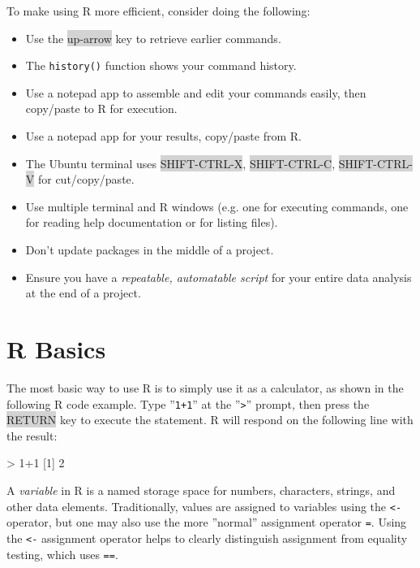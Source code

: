 \begin{infobox}
To make using R more efficient, consider doing the following:

\begin{itemize}
    \item Use the {\footnotesize\colorbox{lightgray}{up-arrow}} key to retrieve earlier commands.
    \item The \texttt{history()} function shows your command history.
    \item Use a notepad app to assemble and edit your commands easily, then copy/paste to R for execution.
    \item Use a notepad app for your results, copy/paste from R.
    \item The Ubuntu terminal uses {\footnotesize\colorbox{lightgray}{SHIFT-CTRL-X}}, {\footnotesize\colorbox{lightgray}{SHIFT-CTRL-C}}, {\footnotesize\colorbox{lightgray}{SHIFT-CTRL-V}} for cut/copy/paste.
    \item Use multiple terminal and R windows (e.g. one for executing commands, one for reading help documentation or for listing files).
    \item Don't update packages in the middle of a project.
    \item Ensure you have a \emph{repeatable, automatable script} for your entire data analysis at the end of a project.
\end{itemize}
\end{infobox}

\section{R Basics}

The most basic way to use R is to simply use it as a calculator, as shown in the following R code example. Type ''\texttt{1+1}'' at the ''\texttt{>}'' prompt, then press the \colorbox{lightgray}{RETURN} key to execute the statement. R will respond on the following line with the result:

\begin{Rcode}
> 1+1
[1] 2
\end{Rcode}

A \emph{variable} in R is a named storage space for numbers, characters, strings, and other data elements. Traditionally, values are assigned to variables using the \texttt{<-} operator, but one may also use the more ''normal'' assignment operator \texttt{=}. Using the \texttt{<-} assignment operator helps to clearly distinguish assignment from equality testing, which uses \texttt{==}. 

